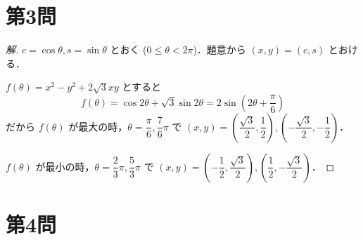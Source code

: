 \documentclass[../main.tex]{subfiles}
\begin{document}
\newpage

\section*{第3問}

\begin{proof}[解]
  $c = \cos\theta, s = \sin\theta$ とおく ($0 \le \theta < 2\pi$)．題意から $(x,y) = (c,s)$ とおける．

  $f(\theta) = x^2 - y^2 + 2\sqrt{3}xy$ とすると
  \[
    f(\theta) = \cos 2\theta + \sqrt{3}\sin 2\theta = 2\sin\left(2\theta + \frac{\pi}{6}\right)
  \]
  だから $f(\theta)$ が最大の時，$\theta = \dfrac{\pi}{6}, \dfrac{7}{6}\pi$ で $(x,y) = \left(\dfrac{\sqrt{3}}{2}, \dfrac{1}{2}\right), \left(-\dfrac{\sqrt{3}}{2}, -\dfrac{1}{2}\right)$．

  $f(\theta)$ が最小の時，$\theta = \dfrac{2}{3}\pi, \dfrac{5}{3}\pi$ で $(x,y) = \left(-\dfrac{1}{2}, \dfrac{\sqrt{3}}{2}\right), \left(\dfrac{1}{2}, -\dfrac{\sqrt{3}}{2}\right)$．
\end{proof}

\newpage

\section*{第4問}
\end{document}
